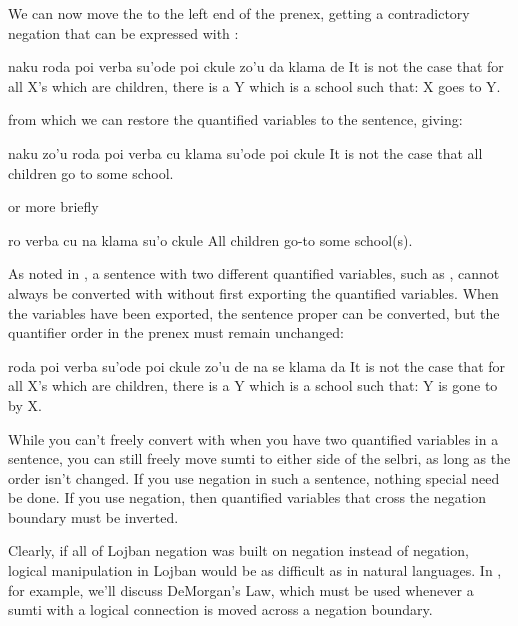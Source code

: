 We can now move the  to the left end of the prenex,
    getting a contradictory negation that can be expressed with
    :
\begin{example}
naku roda poi verba\n
\T	su'ode poi ckule zo'u\n
\T	da klama de\n
It is not the case that for all X's which are children,\n
\T	there is a Y which is a school such that:\n
\T	X goes to Y.
\end{example}

{\noindent}from which we can restore the quantified variables to the
    sentence, giving:
\begin{example}
naku zo'u roda poi verba cu klama su'ode poi ckule\n
It is not the case that all children go to some school.
\end{example}

{\noindent}or more briefly
\begin{example}
ro verba cu na klama su'o ckule\n
All children  go-to some school(s).
\end{example}

As noted in , a sentence with two
    different quantified variables, such as , cannot always be converted
    with  without first exporting the quantified variables.
    When the variables have been exported, the sentence proper can
    be converted, but the quantifier order in the prenex must
    remain unchanged:
\begin{example}
roda poi verba\n
\T	su'ode poi ckule zo'u\n
\T	de na se klama da\n
It is not the case that for all X's which are children,\n
\T	there is a Y which is a school such that:\n
\T	Y is gone to by X.
\end{example}

While you can't freely convert with  when you have two
    quantified variables in a sentence, you can still freely move
    sumti to either side of the selbri, as long as the order isn't
    changed. If you use  negation in such a sentence, nothing
    special need be done. If you use  negation, then
    quantified variables that cross the negation boundary must be
    inverted. 

Clearly, if all of Lojban negation was built on 
    negation instead of  negation, logical manipulation in
    Lojban would be as difficult as in natural languages. In , for example, we'll discuss
    DeMorgan's Law, which must be used whenever a sumti with a
    logical connection is moved across a negation boundary.

